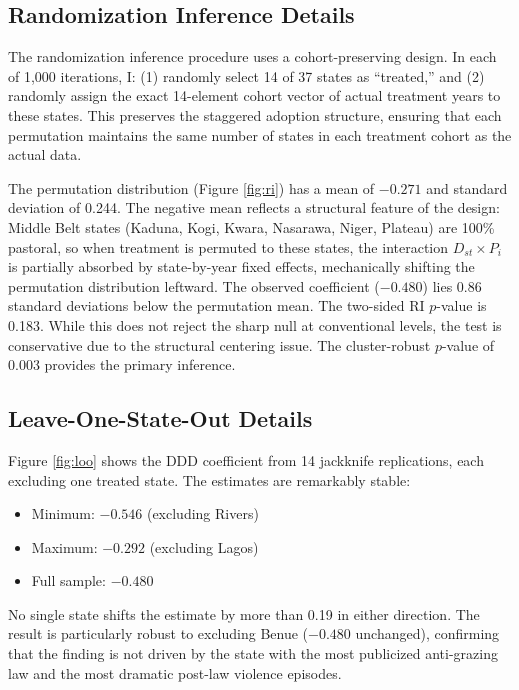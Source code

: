 \documentclass[12pt]{article}
\begin{document}
\subsection{Randomization Inference Details}

The randomization inference procedure uses a cohort-preserving design. In each of 1,000 iterations, I: (1) randomly select 14 of 37 states as ``treated,'' and (2) randomly assign the exact 14-element cohort vector of actual treatment years to these states. This preserves the staggered adoption structure, ensuring that each permutation maintains the same number of states in each treatment cohort as the actual data.

The permutation distribution (Figure \ref{fig:ri}) has a mean of $-0.271$ and standard deviation of 0.244. The negative mean reflects a structural feature of the design: Middle Belt states (Kaduna, Kogi, Kwara, Nasarawa, Niger, Plateau) are 100\% pastoral, so when treatment is permuted to these states, the interaction $D_{st} \times P_i$ is partially absorbed by state-by-year fixed effects, mechanically shifting the permutation distribution leftward. The observed coefficient ($-0.480$) lies 0.86 standard deviations below the permutation mean. The two-sided RI $p$-value is 0.183. While this does not reject the sharp null at conventional levels, the test is conservative due to the structural centering issue. The cluster-robust $p$-value of 0.003 provides the primary inference.

\subsection{Leave-One-State-Out Details}

Figure \ref{fig:loo} shows the DDD coefficient from 14 jackknife replications, each excluding one treated state. The estimates are remarkably stable:
\begin{itemize}
\item Minimum: $-0.546$ (excluding Rivers)
\item Maximum: $-0.292$ (excluding Lagos)
\item Full sample: $-0.480$
\end{itemize}

No single state shifts the estimate by more than 0.19 in either direction. The result is particularly robust to excluding Benue ($-0.480$ unchanged), confirming that the finding is not driven by the state with the most publicized anti-grazing law and the most dramatic post-law violence episodes.
\end{document}
